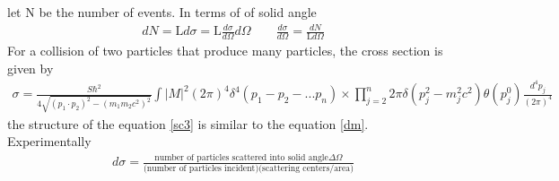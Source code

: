 let N be the number of events. In terms of of solid angle
\begin{align}
    dN=\text{L} d\sigma=\text{L} \frac{d\sigma}{d\Omega} d\Omega \qquad \frac{d\sigma}{d\Omega}=\frac{dN}{\text{L}d\Omega}
\end{align}
For a collision of two particles that produce many particles, the cross section is given by 
\begin{align}\label{sc3}
\sigma=\frac{S\hbar^2 }{4\sqrt{(p_1 \cdot p_2)^2 -(m_1 m_2 c^2)^2} }\int \left| M \right|^2 (2\pi)^4 \delta^4(p_1-p_2-...p_n)\times \prod_{j=2}^n 2\pi \delta (p_j^2-m_j^2 c^2)\theta (p_j^0)\frac{d^4 p_j}{(2\pi)^4}
\end{align} 
the structure of the equation \ref{sc3} is similar to the equation \ref{dm}\cite{griff}.\\

Experimentally
\begin{align}
d\sigma=\frac{\text{number of particles scattered into solid angle} \Delta\Omega}{\text{(number of particles incident)(scattering centers/area)}}
\end{align}